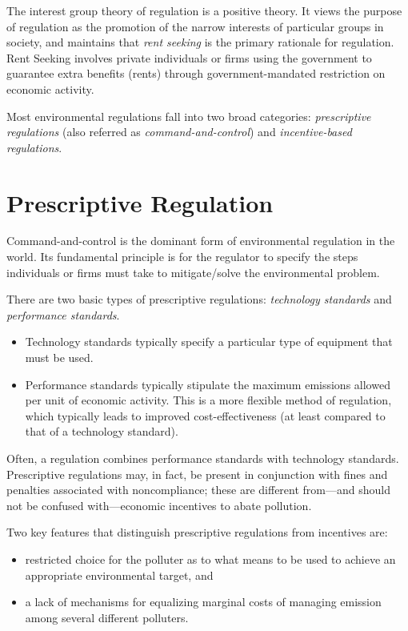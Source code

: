 \documentclass[
]{book}
\providecommand{\tightlist}{%
  \setlength{\itemsep}{0pt}\setlength{\parskip}{0pt}}
\begin{document}
The interest group theory of regulation is a positive theory. It views the purpose of regulation as the promotion of the narrow interests of particular groups in society, and maintains that \emph{rent seeking} is the primary rationale for regulation. Rent Seeking involves private individuals or firms using the government to guarantee extra benefits (rents) through government-mandated restriction on economic activity.

Most environmental regulations fall into two broad categories: \emph{prescriptive regulations} (also referred as \emph{command-and-control}) and \emph{incentive-based regulations}.

\hypertarget{prescriptive-regulation}{%
\section{Prescriptive Regulation}\label{prescriptive-regulation}}

Command-and-control is the dominant form of environmental regulation in the world. Its fundamental principle is for the regulator to specify the steps individuals or firms must take to mitigate/solve the environmental problem.

There are two basic types of prescriptive regulations: \emph{technology standards} and \emph{performance standards}.

\begin{itemize}
\tightlist
\item
  Technology standards typically specify a particular type of equipment that must be used.
\item
  Performance standards typically stipulate the maximum emissions allowed per unit of economic activity. This is a more flexible method of regulation, which typically leads to improved cost-effectiveness (at least compared to that of a technology standard).
\end{itemize}

Often, a regulation combines performance standards with technology standards. Prescriptive regulations may, in fact, be present in conjunction with fines and penalties associated with noncompliance; these are different from---and should not be confused with---economic incentives to abate pollution.

Two key features that distinguish prescriptive regulations from incentives are:

\begin{itemize}
\tightlist
\item
  restricted choice for the polluter as to what means to be used to achieve an appropriate environmental target, and
\item
  a lack of mechanisms for equalizing marginal costs of managing emission among several different polluters.
\end{itemize}
\end{document}
